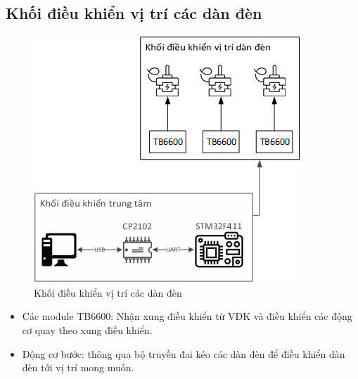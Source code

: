 \subsection{Khối điều khiển vị trí các dàn đèn}
\begin{figure}[htp]
	\centering
	\includegraphics[scale=1]{Chapters/Chapter5/Images/Khoidieukhienlocation.png}
	\caption{Khối điều khiển vị trí các dàn đèn}
	\label{fig:C5Khoidieukhienvitridanden}
\end{figure}
\begin{itemize}
\item Các module TB6600: Nhận xung điều khiển từ VĐK và điều khiển các động cơ quay theo xung điều khiển.
\item Động cơ bước: thông qua bộ truyền đai kéo các dàn đèn để điều khiển dàn đèn tới vị trí mong muốn.
\end{itemize}

